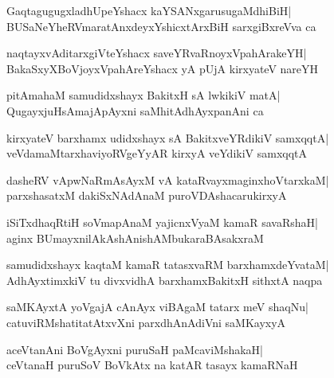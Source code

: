 \documentclass[twoside,12pt,openright]{book}
\newcounter{shloka}[chapter]
\begin{document}
\begin{shloka}%
GaqtagugugxladhUpeYshacx kaYSANxgarusugaMdhiBiH|\\
BUSaNeYheRVmaratAnxdeyxYshicxtArxBiH sarxgiBxreVva ca
\end{shloka}

\begin{shloka}%
naqtayxvAditarxgiVteYshacx saveYRvaRnoyxVpahArakeYH|\\
BakaSxyXBoVjoyxVpahAreYshacx yA pUjA kirxyateV nareYH
\end{shloka}

\begin{shloka}%
pitAmahaM samudidxshayx BakitxH sA lwkikiV matA|\\
QugayxjuHsAmajApAyxni saMhitAdhAyxpanAni ca
\end{shloka}

\begin{shloka}%
kirxyateV barxhamx udidxshayx sA BakitxveYRdikiV samxqqtA|\\
veVdamaMtarxhaviyoRVgeYyAR kirxyA veYdikiV samxqqtA
\end{shloka}

\begin{shloka}%
dasheRV vApwNaRmAsAyxM vA kataRvayxmaginxhoVtarxkaM|\\
parxshasatxM dakiSxNAdAnaM puroVDAshacarukirxyA
\end{shloka}

\begin{shloka}%
iSiTxdhaqRtiH soVmapAnaM yajicnxVyaM kamaR savaRshaH|\\
aginx BUmayxnilAkAshAnishAMbukaraBAsakxraM
\end{shloka}

\begin{shloka}%
samudidxshayx kaqtaM kamaR tatasxvaRM barxhamxdeYvataM|\\
AdhAyxtimxkiV tu divxvidhA barxhamxBakitxH sithxtA naqpa
\end{shloka}

\begin{shloka}%
saMKAyxtA yoVgajA cAnAyx viBAgaM tatarx meV shaqNu|\\
catuviRMshatitatAtxvXni parxdhAnAdiVni saMKayxyA
\end{shloka}

\begin{shloka}%
aceVtanAni BoVgAyxni puruSaH paMcaviMshakaH|\\
ceVtanaH puruSoV BoVkAtx na katAR tasayx kamaRNaH
\end{shloka}
\end{document}
